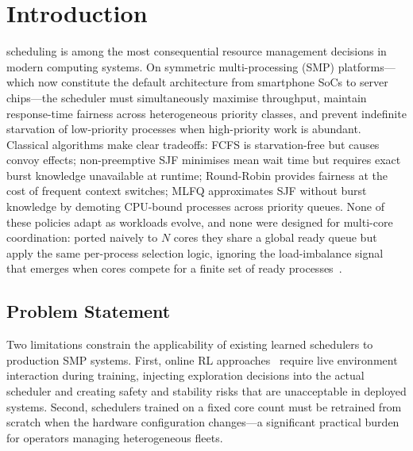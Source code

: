 \documentclass[10pt,journal,compsoc]{IEEEtran}
\begin{document}
\maketitle

\IEEEdisplaynontitleabstractindextext
\IEEEpeerreviewmaketitle

\section{Introduction}
\label{sec:intro}

 scheduling is among the most consequential
resource management decisions in modern computing systems.
On symmetric multi-processing (SMP) platforms---which now constitute the
default architecture from smartphone SoCs to server chips---the scheduler
must simultaneously maximise throughput, maintain response-time fairness
across heterogeneous priority classes, and prevent indefinite starvation
of low-priority processes when high-priority work is abundant.
Classical algorithms make clear tradeoffs:
FCFS is starvation-free but causes convoy effects;
non-preemptive SJF minimises mean wait time but requires exact burst
knowledge unavailable at runtime;
Round-Robin provides fairness at the cost of frequent context switches;
MLFQ approximates SJF without burst knowledge by demoting CPU-bound
processes across priority queues.
None of these policies adapt as workloads evolve, and none were designed
for multi-core coordination: ported naively to $N$ cores they share a
global ready queue but apply the same per-process selection logic,
ignoring the load-imbalance signal that emerges when cores compete for
a finite set of ready processes~\cite{stallings,silberschatz}.

\subsection{Problem Statement}

Two limitations constrain the applicability of existing learned schedulers
to production SMP systems.
First, online RL approaches~\cite{sundqn,hanlearning,linnos} require live
environment interaction during training, injecting exploration decisions
into the actual scheduler and creating safety and stability risks that
are unacceptable in deployed systems.
Second, schedulers trained on a fixed core count must be retrained from
scratch when the hardware configuration changes---a significant practical
burden for operators managing heterogeneous fleets.
\end{document}
